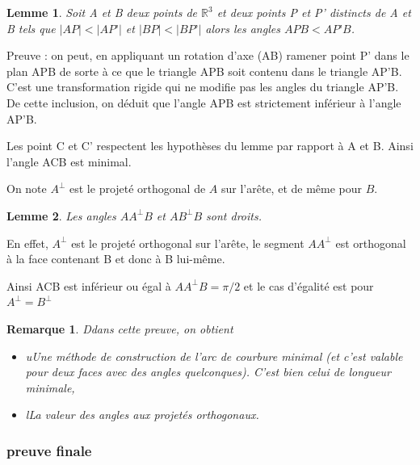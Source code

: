 \documentclass{article}
\newtheorem{lem}{Lemme}
\newtheorem{rem}{Remarque}
\begin{document}
\begin{lem}
Soit A et B deux points de $\mathbb{R}^3$ et deux points P et P’ distincts de A et B tels que $|AP|<|AP’|$ et $|BP|<|BP’|$ alors les angles $APB<AP’B$.
\end{lem}
Preuve : on peut, en appliquant un rotation d’axe (AB) ramener point P’ dans le plan APB de sorte à ce que le triangle APB soit contenu dans le triangle AP’B. C’est une transformation rigide qui ne modifie pas les angles du triangle AP’B. De cette inclusion, on déduit que l’angle APB est strictement inférieur à l’angle AP’B.  

Les point C et C’ respectent les hypothèses du lemme par rapport à A et B. Ainsi l’angle ACB est minimal. 

On note $A^\perp$ est le projeté orthogonal de $A$ sur l’arête, et de même pour $B$.
\begin{lem}
Les angles  $AA^\perp B$ et $AB^\perp B$ sont droits.
\end{lem}
En effet, $A^\perp$ est le projeté orthogonal sur l’arête, le segment $AA^\perp$ est orthogonal à la face contenant B et donc à B lui-même. 

Ainsi ACB est inférieur ou égal à $AA^\perp B=\pi/2$ et le cas d’égalité est pour $A^\perp =B^\perp $

\begin{rem}
Ddans cette preuve, on obtient 
\begin{itemize}
    \item uUne méthode de construction de l’arc de courbure minimal (et c’est valable pour deux faces avec des angles quelconques). C'est bien celui de longueur minimale,
    \item lLa valeur des angles aux projetés orthogonaux. 
\end{itemize}
\end{rem}


\subsubsection{preuve finale}
\end{document}

